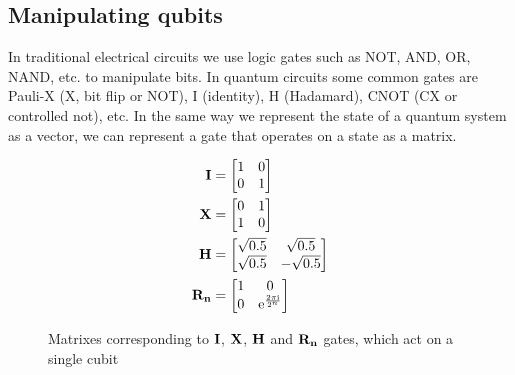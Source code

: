 \subsection{Manipulating qubits}
\noindent
In traditional electrical circuits we use logic gates such as NOT, AND, OR, NAND, etc. to manipulate bits. In quantum circuits some common gates are Pauli-X (X, bit flip or NOT), I (identity), H (Hadamard), CNOT (CX or controlled not), etc. In the same way we represent the state of a quantum system as a vector, we can represent a gate that operates on a state as a matrix. 
\newcommand{\qi}{\begin{bmatrix}
        1 & 0\\
        0 & 1\\
    \end{bmatrix}}
\newcommand{\qre}[1]{\mathrm{e}^{\frac{2\pi \mathrm{i}}{2^{#1}}}}
\newcommand{\qr}[1]{\begin{bmatrix}
        1 & 0\\
        0 & \qre{#1}\\
    \end{bmatrix}}
\newcommand{\qx}{\begin{bmatrix}
        0 & 1\\
        1 & 0\\
    \end{bmatrix}}
\newcommand{\qh}{\begin{bmatrix}
        \sqrt{0.5} & \sqrt{0.5}\\
        \sqrt{0.5} & -\sqrt{0.5}\\
    \end{bmatrix}}
\newcommand{\qcx}{\begin{bmatrix}
        1 & 0 & 0 & 0\\
        0 & 1 & 0 & 0\\
        0 & 0 & 0 & 1\\
        0 & 0 & 1 & 0\\
    \end{bmatrix}}
    

\begin{figure}[H]
    \centering
    \begin{align*}
        \qti &= \qi\\
        \qtx &= \qx\\
        \qth &= \qh\\
        \qtr{n} &= \qr{n}
    \end{align*}
    \caption{Matrixes corresponding to $\mathbf{I}$, $\mathbf{X}$, $\mathbf{H}$ and $\mathbf{R_{n}}$ gates, which act on a single cubit}
    \label{fig:single_qubit_gates}
\end{figure}

